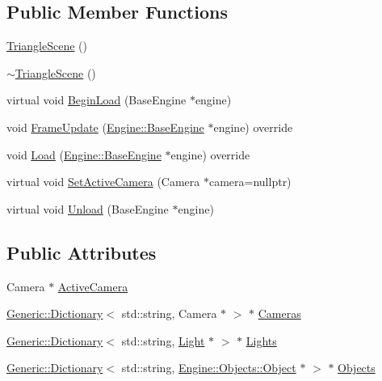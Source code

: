 \subsection*{Public Member Functions}
\begin{DoxyCompactItemize}
\item 
\mbox{\hyperlink{classApplication_1_1Scenes_1_1TriangleScene_a36015fc65ca3005d57f23a1e2f34f016}{Triangle\+Scene}} ()
\item 
\mbox{\hyperlink{classApplication_1_1Scenes_1_1TriangleScene_a5b1166cd574db6efeea5de8029672437}{$\sim$\+Triangle\+Scene}} ()
\item 
virtual void \mbox{\hyperlink{classEngine_1_1Components_1_1Scene_af18bd334fe66952b8d79b8e9e99ab2d8}{Begin\+Load}} (Base\+Engine $\ast$engine)
\item 
void \mbox{\hyperlink{classApplication_1_1Scenes_1_1TriangleScene_a5622996232a2ad52735251c8398b0c9a}{Frame\+Update}} (\mbox{\hyperlink{classEngine_1_1BaseEngine}{Engine\+::\+Base\+Engine}} $\ast$engine) override
\item 
void \mbox{\hyperlink{classApplication_1_1Scenes_1_1TriangleScene_a4bfd44cab6aa0eafe47f379dafe3843e}{Load}} (\mbox{\hyperlink{classEngine_1_1BaseEngine}{Engine\+::\+Base\+Engine}} $\ast$engine) override
\item 
virtual void \mbox{\hyperlink{classEngine_1_1Components_1_1Scene_a936218df56c481f3aa12d684cee038f3}{Set\+Active\+Camera}} (Camera $\ast$camera=nullptr)
\item 
virtual void \mbox{\hyperlink{classEngine_1_1Components_1_1Scene_a064ce89da5daa483369c3253f04c9d21}{Unload}} (Base\+Engine $\ast$engine)
\end{DoxyCompactItemize}
\subsection*{Public Attributes}
\begin{DoxyCompactItemize}
\item 
Camera $\ast$ \mbox{\hyperlink{classEngine_1_1Components_1_1Scene_a9408befee37d89e2c001d25b9e4ed75a}{Active\+Camera}}
\item 
\mbox{\hyperlink{classGeneric_1_1Dictionary}{Generic\+::\+Dictionary}}$<$ std\+::string, Camera $\ast$ $>$ $\ast$ \mbox{\hyperlink{classEngine_1_1Components_1_1Scene_aea98ff1ced88ee859878b504e9a2a362}{Cameras}}
\item 
\mbox{\hyperlink{classGeneric_1_1Dictionary}{Generic\+::\+Dictionary}}$<$ std\+::string, \mbox{\hyperlink{classLight}{Light}} $\ast$ $>$ $\ast$ \mbox{\hyperlink{classEngine_1_1Components_1_1Scene_a00f60de2f6c72242a7af0076a3b75e5e}{Lights}}
\item 
\mbox{\hyperlink{classGeneric_1_1Dictionary}{Generic\+::\+Dictionary}}$<$ std\+::string, \mbox{\hyperlink{classEngine_1_1Objects_1_1Object}{Engine\+::\+Objects\+::\+Object}} $\ast$ $>$ $\ast$ \mbox{\hyperlink{classEngine_1_1Components_1_1Scene_a23481feabaaa56bf5613765db03af4da}{Objects}}
\end{DoxyCompactItemize}
